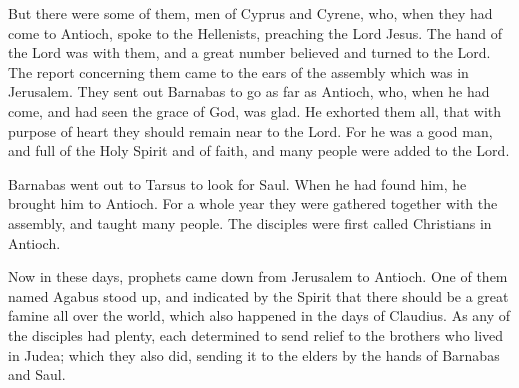 {But there were some of them, men of Cyprus and Cyrene, who, when they had come to Antioch, spoke to the Hellenists, preaching the Lord Jesus.
The hand of the Lord was with them, and a great number believed and turned to the Lord.
The report concerning them came to the ears of the assembly which was in Jerusalem. They sent out Barnabas to go as far as Antioch,
who, when he had come, and had seen the grace of God, was glad. He exhorted them all, that with purpose of heart they should remain near to the Lord.
For he was a good man, and full of the Holy Spirit and of faith, and many people were added to the Lord.
\par }{\PP {}Barnabas went out to Tarsus to look for Saul.
When he had found him, he brought him to Antioch. For a whole year they were gathered together with the assembly, and taught many people. The disciples were first called Christians in Antioch.
\par }{\PP {}Now in these days, prophets came down from Jerusalem to Antioch.
One of them named Agabus stood up, and indicated by the Spirit that there should be a great famine all over the world, which also happened in the days of Claudius.
As any of the disciples had plenty, each determined to send relief to the brothers who lived in Judea;
which they also did, sending it to the elders by the hands of Barnabas and Saul.

}
